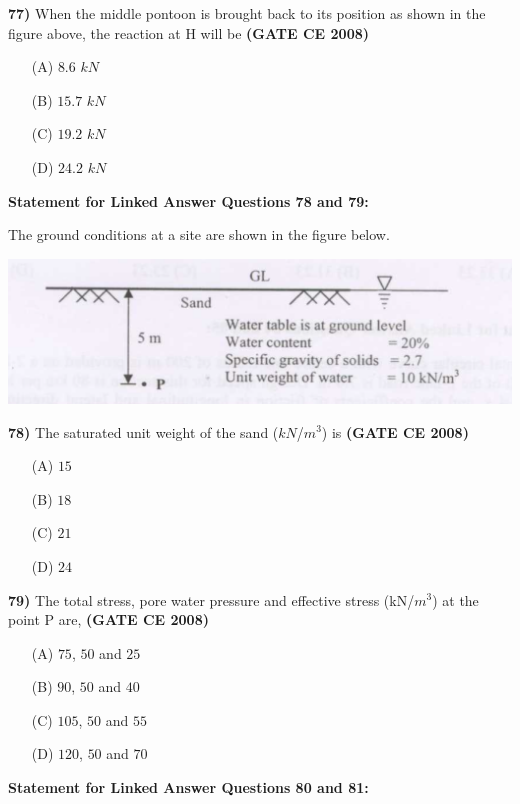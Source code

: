 \documentclass[journal]{IEEEtran}
\begin{document}
\begin{enumerate}
\textbf{77)} \hspace{0.2cm} When the middle pontoon is brought back to its position as shown in the figure above, the reaction at H will be \textbf{(GATE CE 2008)}
\begin{itemize}
    \item[(A)] $8.6$ $kN$
    \item[(B)] $15.7$ $kN$
    \item[(C)] $19.2$ $kN$
    \item[(D)] $24.2$ $kN$
\end{itemize}

\vspace{0.5cm}
\textbf{Statement for Linked Answer Questions 78 and 79:}

The ground conditions at a site are shown in the figure below.

\vspace{0.3cm}
\includegraphics[width=\textwidth]{image10.png} 
\vspace{0.3cm}

\textbf{78)} The saturated unit weight of the sand ($kN$/$m^{3}$) is \textbf{(GATE CE 2008)}
\begin{itemize}
    \item[(A)] $15$
    \item[(B)] $18$
    \item[(C)] $21$
    \item[(D)] $24$
\end{itemize}

\textbf{79)} The total stress, pore water pressure and effective stress (kN/$m^{3}$) at the point P are,  \textbf{(GATE CE 2008)}
\begin{itemize}
    \item[(A)] $75$, $50$ and $25$
    \item[(B)] $90$, $50$ and $40$
    \item[(C)] $105$, $50$ and $55$
    \item[(D)] $120$, $50$ and $70$
\end{itemize}



\textbf{Statement for Linked Answer Questions 80 and 81:}


\end{enumerate}
\end{document}
